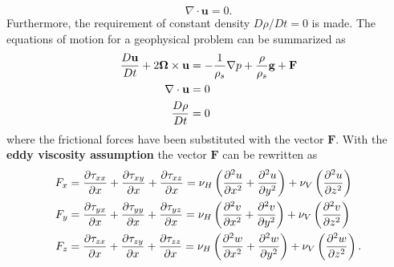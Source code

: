 \begin{equation}
\nabla\cdot\mathbf{u}=0.
\end{equation}
Furthermore, the requirement of constant density $D\rho/Dt=0$ is made. The equations of motion for a geophysical problem can be summarized as
\begin{align}
\dfrac{D\mathbf{u}}{Dt}+2\boldsymbol{\Omega}\times\mathbf{u}&=-\dfrac{1}{\rho_{s}}\nabla p +\dfrac{\rho}{\rho_{s}}\mathbf{g}+\mathbf{F}\\
\nabla\cdot\mathbf{u}&=0\\
\dfrac{D\rho}{Dt}&=0
\end{align}
where the frictional forces have been substituted with the vector $\mathbf{F}$. With the \textbf{eddy viscosity assumption} the vector $\mathbf{F}$ can be rewritten as
\begin{align*}
F_{x}&=\dfrac{\partial\tau_{xx}}{\partial x}+\dfrac{\partial\tau_{xy}}{\partial x}+\dfrac{\partial\tau_{xz}}{\partial x}=\nu_{H}\left( \dfrac{\partial^{2} u}{\partial x^{2}}+\dfrac{\partial^{2} u}{\partial y^{2}} \right)+\nu_{V}\left( \dfrac{\partial^{2} u}{\partial z^{2}} \right)\\
F_{y}&=\dfrac{\partial\tau_{yx}}{\partial x}+\dfrac{\partial\tau_{yy}}{\partial x}+\dfrac{\partial\tau_{yz}}{\partial x}=\nu_{H}\left( \dfrac{\partial^{2} v}{\partial x^{2}}+\dfrac{\partial^{2} v}{\partial y^{2}} \right)+\nu_{V}\left( \dfrac{\partial^{2} v}{\partial z^{2}} \right)\\
F_{z}&=\dfrac{\partial\tau_{zx}}{\partial x}+\dfrac{\partial\tau_{zy}}{\partial x}+\dfrac{\partial\tau_{zz}}{\partial x}=\nu_{H}\left( \dfrac{\partial^{2} w}{\partial x^{2}}+\dfrac{\partial^{2} w}{\partial y^{2}} \right)+\nu_{V}\left( \dfrac{\partial^{2} w}{\partial z^{2}} \right).
\end{align*}
